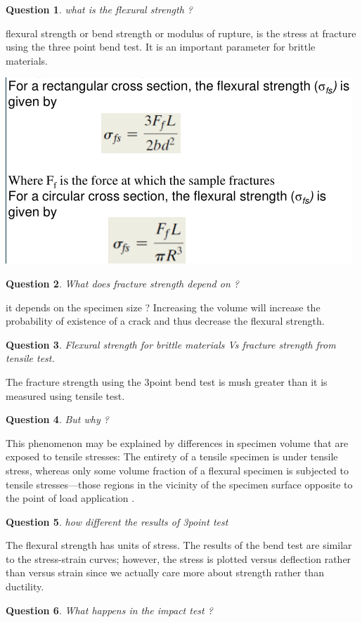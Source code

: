 \documentclass[13]{article}
\newtheorem{exer}{Question}
\begin{document}
\begin{exer}
what is the flexural strength ?
\end{exer}
flexural strength or bend strength or modulus of rupture, is the stress at fracture using the three point bend test. It is an important parameter for brittle materials.
\begin{center}
\includegraphics[scale=0.5]{figures/27.png}
\end{center}
\begin{exer}
What does fracture strength depend on ?
\end{exer}
it depends on the specimen size ? Increasing the volume will increase the probability of existence of a crack and thus decrease the flexural strength. 
\begin{exer}
Flexural strength for brittle materials Vs fracture strength from tensile test.
\end{exer}
The fracture strength using the 3point bend test is mush greater than it is measured using tensile test. 
\begin{exer}
But why ?
\end{exer}
This phenomenon may be explained by differences in specimen volume that are
exposed to tensile stresses: The entirety of a tensile specimen is under
tensile stress, whereas only some volume fraction of a flexural specimen is
subjected to tensile stresses—those regions in the vicinity of the specimen
surface opposite to the point of load application .
\begin{exer}
how different the results of 3point test 
\end{exer}
The flexural strength has units of stress. The results of the bend test are
similar to the stress-strain curves; however, the stress is plotted versus
deflection rather than versus strain since we actually care more about
strength rather than ductility. 
\begin{exer}
What happens in the impact test ?
\end{exer}
\end{document}
